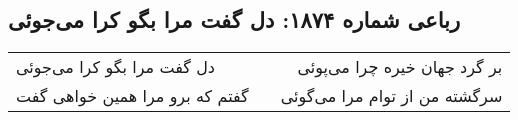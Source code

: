 \begin{center}
\section*{رباعی شماره ۱۸۷۴: دل گفت مرا بگو کرا می‌جوئی}
\label{sec:1874}
\begin{longtable}{l p{0.5cm} r}
دل گفت مرا بگو کرا می‌جوئی
&&
بر گرد جهان خیره چرا می‌پوئی
\\
گفتم که برو مرا همین خواهی گفت
&&
سرگشته من از توام مرا می‌گوئی
\\
\end{longtable}
\end{center}
